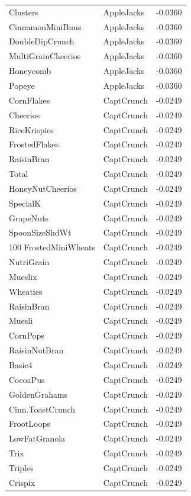 \begin{longtable}{llr}
Clusters & AppleJacks & -0.0360 \\
CinnamonMiniBuns & AppleJacks & -0.0360 \\
DoubleDipCrunch & AppleJacks & -0.0360 \\
MultiGrainCheerios & AppleJacks & -0.0360 \\
Honeycomb & AppleJacks & -0.0360 \\
Popeye & AppleJacks & -0.0360 \\
CornFlakes & CaptCrunch & -0.0249 \\
Cheerios & CaptCrunch & -0.0249 \\
RiceKrispies & CaptCrunch & -0.0249 \\
FrostedFlakes & CaptCrunch & -0.0249 \\
RaisinBran & CaptCrunch & -0.0249 \\
Total & CaptCrunch & -0.0249 \\
HoneyNutCheerios & CaptCrunch & -0.0249 \\
SpecialK & CaptCrunch & -0.0249 \\
GrapeNuts & CaptCrunch & -0.0249 \\
SpoonSizeShdWt & CaptCrunch & -0.0249 \\
100%
FrostedMiniWheats & CaptCrunch & -0.0249 \\
NutriGrain & CaptCrunch & -0.0249 \\
Mueslix & CaptCrunch & -0.0249 \\
Wheaties & CaptCrunch & -0.0249 \\
RaisinBran & CaptCrunch & -0.0249 \\
Muesli & CaptCrunch & -0.0249 \\
CornPops & CaptCrunch & -0.0249 \\
RaisinNutBran & CaptCrunch & -0.0249 \\
Basic4 & CaptCrunch & -0.0249 \\
CocoaPus & CaptCrunch & -0.0249 \\
GoldenGrahams & CaptCrunch & -0.0249 \\
Cinn.ToastCrunch & CaptCrunch & -0.0249 \\
FrootLoops & CaptCrunch & -0.0249 \\
LowFatGranola & CaptCrunch & -0.0249 \\
Trix & CaptCrunch & -0.0249 \\
Triples & CaptCrunch & -0.0249 \\
Crispix & CaptCrunch & -0.0249 \\

\end{longtable}

